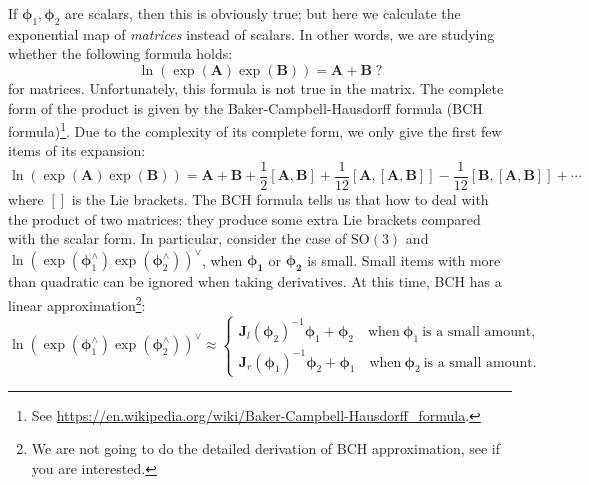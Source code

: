 If $\boldsymbol{\phi}_1, \boldsymbol{\phi}_2$ are scalars, then this is obviously true; but here we calculate the exponential map of \textit{matrices} instead of scalars. In other words, we are studying whether the following formula holds:
\[
\ln \left( \exp \left( \mathbf{A} \right) \exp \left( \mathbf{B} \right) \right) = \mathbf{A} + \mathbf{B} \; ?
\]
for matrices. Unfortunately, this formula is not true in the matrix. The complete form of the product is given by the Baker-Campbell-Hausdorff formula (BCH formula)\footnote{ See \url{https://en.wikipedia.org/wiki/Baker-Campbell-Hausdorff\_formula}. }. Due to the complexity of its complete form, we only give the first few items of its expansion:
\begin{equation}
\ln \left( {\exp \left( \mathbf{A} \right)\exp \left( \mathbf{B} \right)} \right) = \mathbf{A} + \mathbf{B} + \frac{1}{2}\left[ {\mathbf{A}, \mathbf{B}} \right] + \frac{1}{{12}}\left[ {\mathbf{A},\left[ {\mathbf{A}, \mathbf{B}} \right]} \right] - \frac{1}{{12}}\left[ {\mathbf{B},\left[ {\mathbf{A} ,\mathbf{B}} \right]} \right] + \cdots
\end{equation}
where $[]$ is the Lie brackets. The BCH formula tells us that how to deal with the product of two matrices: they produce some extra Lie brackets compared with the scalar form. In particular, consider the case of $\mathrm{SO}(3)$ and $\ln { \left( {\exp \left( { \boldsymbol{\phi} _1^ \wedge } \right)\exp \left ( {\boldsymbol{\phi} _2^ \wedge } \right)} \right) ^ \vee }$, when $\boldsymbol{\phi_1}$ or $\boldsymbol{\phi_2}$ is small. Small items with more than quadratic can be  ignored when taking derivatives. At this time, BCH has a linear approximation\footnote{We are not going to do the detailed derivation of BCH approximation, see \cite{Barfoot2016} if you are interested. }:
\begin{equation}
\ln { \left( {\exp \left( { \boldsymbol{\phi} _1^ \wedge } \right)\exp \left( {\boldsymbol{\phi} _2^ \wedge } \right)} \right ) ^ \vee } \approx \left\{
\begin{array}{l}
{\mathbf{J}_l}{\left( {{\boldsymbol{\phi} _2}} \right)^{ - 1}}{ \boldsymbol{\phi} _1} + {\boldsymbol{\phi} _2 } \quad \text{when} \ \boldsymbol{\phi}_1 \ \text{is a small amount},\\
{\mathbf{J}_r}{\left( {{\boldsymbol{\phi} _1}} \right)^{ - 1}}{\boldsymbol{\phi} _2} + {\boldsymbol{\phi} _1 } \quad \text{when} \  \boldsymbol{\phi}_2 \ \text{is a small amount}.
\end{array} \right.
\end{equation}

